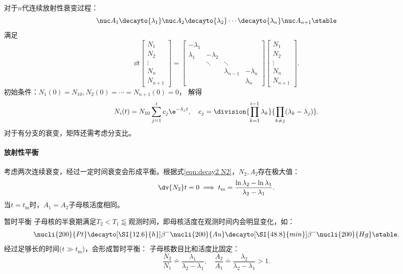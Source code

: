 \begin{example}
	对于$n$代连续放射性衰变过程：
	\[
		\nuc A_1\decayto{\lambda_1}\nuc A_2\decayto{\lambda_2}\cdots\decayto{\lambda_n}\nuc A_{n+1}\stable
	\]
	满足
	\begin{equation}
		\dd t
		\begin{bmatrix}
			N_1\\N_2\\\vdots\\N_n\\N_{n+1}
		\end{bmatrix}
		=
		\begin{bmatrix}
			-\lambda_1\\
			\lambda_1&-\lambda_2\\
			&\ddots&\ddots\\
			&&\lambda_{n-1}&-\lambda_n\\
			&&&\lambda_n
		\end{bmatrix}
		\begin{bmatrix}
			N_1\\N_2\\\vdots\\N_n\\N_{n+1}
		\end{bmatrix}.
	\end{equation}
	初始条件：$N_1(0)=N_{10},N_2(0)=\cdots=N_{n+1}(0)=0$，
	解得
	\begin{equation}
		N_i(t)=N_{10}\sum_{j=1}^i c_j\e^{-\lambda_jt},\quad c_j=\division{\prod_{k=1}^{i-1}\lambda_k}{\prod_{k\neq j}(\lambda_k-\lambda_j)}.
	\end{equation}
	对于有分支的衰变，矩阵还需考虑分支比。
\end{example}

\paragraph{放射性平衡}

考虑两次连续衰变，经过一定时间衰变会形成平衡。根据式\eqref{eqn:decay2 N2}，$N_2,A_2$存在极大值：
\begin{equation}
	\dv{N_2}t=0\implies t_\mathrm m=\frac{\ln\lambda_2-\ln\lambda_1}{\lambda_2-\lambda_1}.
\end{equation}
当$t=t_\mathrm m$时，$A_1=A_2$子母核活度相同。

\begin{definition}
	{暂时平衡}{}
	子母核的半衰期满足$T_2<T_1\lessapprox$观测时间，即母核活度在观测时间内会明显变化，如：
	\[
		\nucli{200}{Pt}\decayto[\SI{12.6}{h}]{\beta^-}\nucli{200}{Au}\decayto[\SI{48.8}{min}]{\beta^-}\nucli{200}{Hg}\stable.
	\]
	经过足够长的时间($t\gg t_\mathrm m$)，会形成暂时平衡：
	子母核数目比和活度比固定：
	\begin{equation}
		\frac{N_2}{N_1}\doteq\frac{\lambda_1}{\lambda_2-\lambda_1},\quad\frac{A_2}{A_1}\doteq\frac{\lambda_2}{\lambda_2-\lambda_1}>1.
	\end{equation}
\end{definition}

